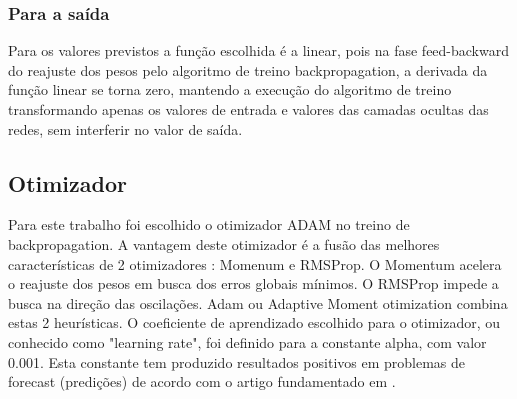\documentclass[	12pt, Times, openright, twoside, a4paper, english, brazil]{abntex2}
\begin{document}
    	\subsubsection{Para a saída}
    	    Para os valores previstos a função escolhida é a linear, pois na fase feed-backward do reajuste dos pesos pelo algoritmo de treino backpropagation, a derivada da função linear se torna zero, mantendo a execução do algoritmo de treino transformando apenas os valores de entrada e valores das camadas ocultas das redes, sem interferir no valor de saída.
    \subsection{Otimizador}
        \begin{figure}[H]
        	 \label{fig:otimizadores}
        \end{figure}
        Para este trabalho foi escolhido o otimizador ADAM no treino de backpropagation.
        A vantagem deste otimizador é a fusão das melhores características de 2 otimizadores :\newline 
         Momenum e RMSProp. \newline
        O Momentum acelera o reajuste dos pesos em busca dos erros globais mínimos.\newline
         O RMSProp impede a busca na direção das oscilações.\newline
         Adam ou Adaptive Moment otimization combina estas 2 heurísticas.
        O coeficiente de aprendizado escolhido para o otimizador, ou conhecido como "learning rate", foi definido para a constante alpha, com valor 0.001.
        Esta constante tem produzido resultados positivos em problemas de forecast (predições) de acordo com o artigo fundamentado em \cite{MLM}.
\end{document}
